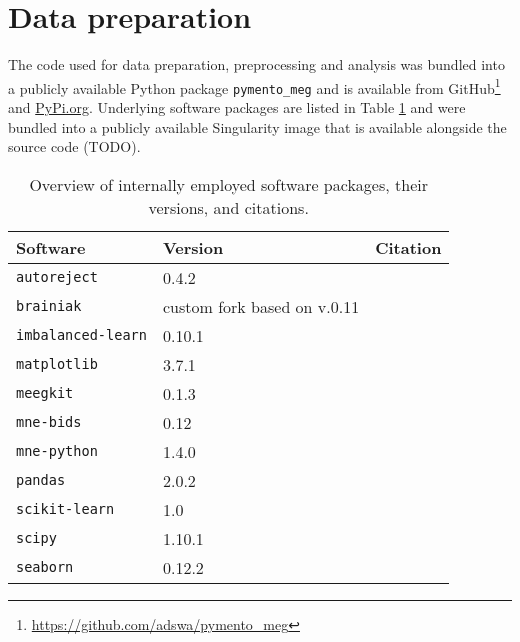 \section{Data preparation}

The code used for data preparation, preprocessing and analysis was bundled into a publicly available Python package \texttt{pymento\_meg} and is available from GitHub\footnote{\url{https://github.com/adswa/pymento_meg}} and \url{PyPi.org}.
Underlying software packages are listed in Table \ref{tab:software} and were bundled into a publicly available Singularity image that is available alongside the source code (TODO).
\begin{center}
\begin{table}[H]
	\begin{tabular}{ l l l }
		\hline
		Software	& Version 	& Citation \\ \hline
		\texttt{autoreject} 	& 0.4.2 	& \citet{jas2017autoreject} \\
		\texttt{brainiak} 	& custom fork based on v.0.11 & \citet{brainiak} \\
		\texttt{imbalanced-learn} & 0.10.1 & \citet{JMLR:v18:16-365} \\
		\texttt{matplotlib} 	& 3.7.1 	& \citet{Hunter2007} \\
		\texttt{meegkit} 	& 0.1.3 	& \citet{barascud2022} \\
		\texttt{mne-bids} 	& 0.12 		&  \citet{Appelhoff2019} \\
		\texttt{mne-python} 	& 1.4.0		& \citet{Gramfort_MEG_and_EEG_2013} \\
		\texttt{pandas} 		& 2.0.2 	& \citet{The_pandas_development_team_pandas-dev_pandas_Pandas} \\
		\texttt{scikit-learn} & 1.0	 	& \citet{scikit-learn} \\
		\texttt{scipy} 		& 1.10.1 	& \citet{2020SciPy-NMeth} \\
		\texttt{seaborn} 	& 0.12.2 	& \citet{Waskom2021}
	\end{tabular}
	\caption[Overview of software packages]{Overview of internally employed software packages, their versions, and citations.}
	\label{tab:software}
\end{table}
\end{center}

